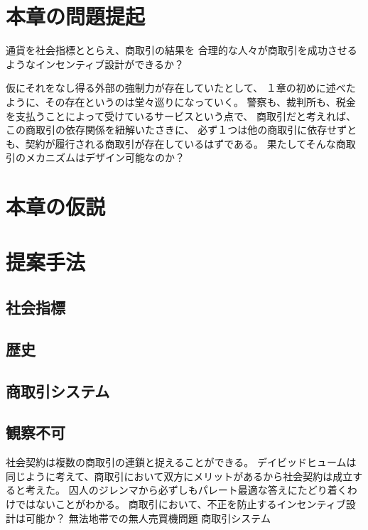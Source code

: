 \section{本章の問題提起}
通貨を社会指標ととらえ、商取引の結果を
合理的な人々が商取引を成功させるようなインセンティブ設計ができるか？

仮にそれをなし得る外部の強制力が存在していたとして、
１章の初めに述べたように、その存在というのは堂々巡りになっていく。
警察も、裁判所も、税金を支払うことによって受けているサービスという点で、
商取引だと考えれば、この商取引の依存関係を紐解いたさきに、
必ず１つは他の商取引に依存せずとも、契約が履行される商取引が存在しているはずである。
果たしてそんな商取引のメカニズムはデザイン可能なのか？

\section{本章の仮説}

\section{提案手法}
\subsection{社会指標}

\subsection{歴史}

\subsection{商取引システム}

\subsection{観察不可}



% 
% 
% 





社会契約は複数の商取引の連鎖と捉えることができる。
デイビッドヒュームは同じように考えて、商取引において双方にメリットがあるから社会契約は成立すると考えた。
囚人のジレンマから必ずしもパレート最適な答えにたどり着くわけではないことがわかる。
商取引において、不正を防止するインセンティブ設計は可能か？
無法地帯での無人売買機問題
商取引システム